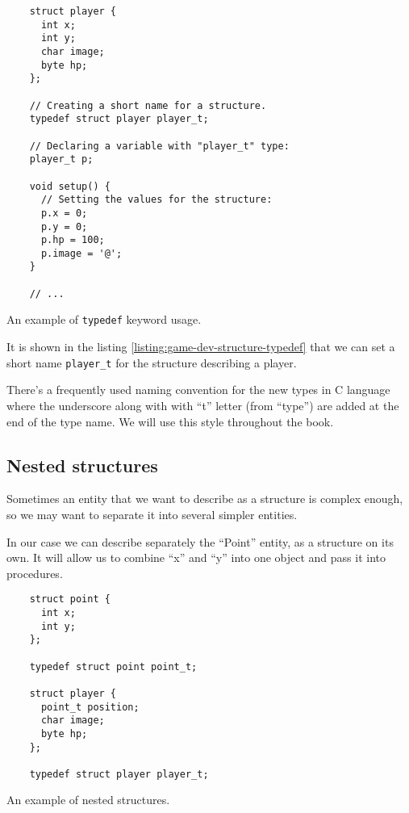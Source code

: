 \documentclass[../sparc.tex]{subfiles}
\begin{document}
\begin{listing}[H]
  \begin{verbatim}
    struct player {
      int x;
      int y;
      char image;
      byte hp;
    };

    // Creating a short name for a structure.
    typedef struct player player_t;

    // Declaring a variable with "player_t" type:
    player_t p;

    void setup() {
      // Setting the values for the structure:
      p.x = 0;
      p.y = 0;
      p.hp = 100;
      p.image = '@';
    }

    // ...
  \end{verbatim}
  \caption{An example of \texttt{typedef} keyword usage.}
  \label{listing:game-dev-structure-typedef}
\end{listing}

It is shown in the listing \ref{listing:game-dev-structure-typedef} that we can
set a short name \texttt{player_t} for the structure describing a
player.

There's a frequently used naming convention for the new types in C language
where the underscore along with with ``t'' letter (from ``type'') are added at
the end of the type name.  We will use this style throughout the book.

\subsection{Nested structures}

Sometimes an entity that we want to describe as a structure is complex enough,
so we may want to separate it into several simpler entities.

In our case we can describe separately the ``Point'' entity, as a structure on
its own.  It will allow us to combine ``x'' and ``y'' into one object and pass
it into procedures.

\begin{listing}[H]
  \begin{verbatim}
    struct point {
      int x;
      int y;
    };

    typedef struct point point_t;

    struct player {
      point_t position;
      char image;
      byte hp;
    };

    typedef struct player player_t;
  \end{verbatim}
  \caption{An example of nested structures.}
  \label{listing:game-dev-nested-structures}
\end{listing}
\end{document}
